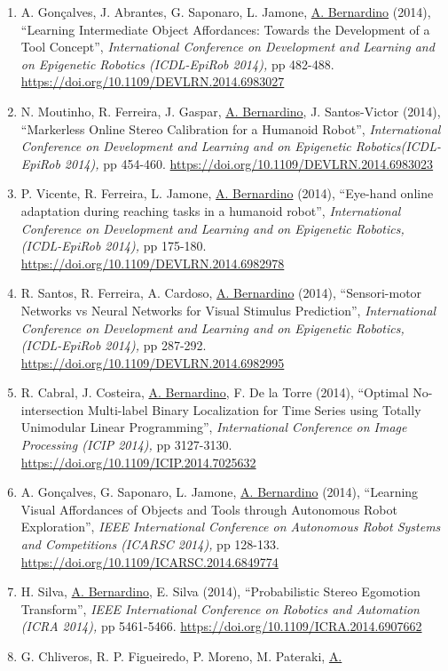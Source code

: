 \begin{enumerate}
\item
  A. Gonçalves, J. Abrantes, G. Saponaro, L. Jamone, \ul{A. Bernardino}
  (2014), ``Learning Intermediate Object Affordances: Towards the
  Development of a Tool Concept'', \emph{International Conference on
  Development and Learning and on Epigenetic Robotics (ICDL-EpiRob
  2014),} pp 482-488. \url{https://doi.org/10.1109/DEVLRN.2014.6983027}~
\item
  N. Moutinho, R. Ferreira, J. Gaspar, \ul{A. Bernardino}, J.
  Santos-Victor (2014), ``Markerless Online Stereo Calibration for a
  Humanoid Robot'', \emph{International Conference on Development and
  Learning and on Epigenetic Robotics(ICDL-EpiRob 2014),} pp 454-460.
  \url{https://doi.org/10.1109/DEVLRN.2014.6983023}~
\item
  P. Vicente, R. Ferreira, L. Jamone, \ul{A. Bernardino} (2014),
  ``Eye-hand online adaptation during reaching tasks in a humanoid
  robot'', \emph{International Conference on Development and Learning
  and on Epigenetic Robotics, (ICDL-EpiRob 2014),} pp 175-180.
  \url{https://doi.org/10.1109/DEVLRN.2014.6982978}~
\item
  R. Santos, R. Ferreira, A. Cardoso, \ul{A. Bernardino} (2014),
  ``Sensori-motor Networks vs Neural Networks for Visual Stimulus
  Prediction'', \emph{International Conference on Development and
  Learning and on Epigenetic Robotics, (ICDL-EpiRob 2014),} pp 287-292.
  \url{https://doi.org/10.1109/DEVLRN.2014.6982995}~
\item
  R. Cabral, J. Costeira, \ul{A. Bernardino}, F. De la Torre (2014),
  ``Optimal No-intersection Multi-label Binary Localization for Time
  Series using Totally Unimodular Linear Programming'',
  \emph{International Conference on Image Processing (ICIP 2014),} pp
  3127-3130. \url{https://doi.org/10.1109/ICIP.2014.7025632}~
\item
  A. Gonçalves, G. Saponaro, L. Jamone, \ul{A. Bernardino} (2014),
  ``Learning Visual Affordances of Objects and Tools through Autonomous
  Robot Exploration'', \emph{IEEE International Conference on Autonomous
  Robot Systems and Competitions (ICARSC 2014),} pp 128-133.
  \url{https://doi.org/10.1109/ICARSC.2014.6849774}~
\item
  H. Silva, \ul{A. Bernardino}, E. Silva (2014), ``Probabilistic Stereo
  Egomotion Transform'', \emph{IEEE International Conference on Robotics
  and Automation (ICRA 2014),} pp 5461-5466.
  \url{https://doi.org/10.1109/ICRA.2014.6907662}~
\item
  G. Chliveros, R. P. Figueiredo, P. Moreno, M. Pateraki, \ul{A.
}
\end{enumerate}
